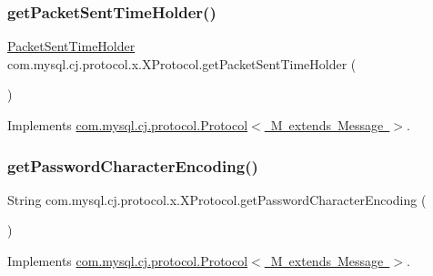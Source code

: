 \subsubsection{\texorpdfstring{get\+Packet\+Sent\+Time\+Holder()}{getPacketSentTimeHolder()}}
{\footnotesize\ttfamily \mbox{\hyperlink{interfacecom_1_1mysql_1_1cj_1_1protocol_1_1_packet_sent_time_holder}{Packet\+Sent\+Time\+Holder}} com.\+mysql.\+cj.\+protocol.\+x.\+X\+Protocol.\+get\+Packet\+Sent\+Time\+Holder (\begin{DoxyParamCaption}{ }\end{DoxyParamCaption})}



Implements \mbox{\hyperlink{interfacecom_1_1mysql_1_1cj_1_1protocol_1_1_protocol_a412e8ba9beb161548f142a1178c910d2}{com.\+mysql.\+cj.\+protocol.\+Protocol$<$ M extends Message $>$}}.

\mbox{\label{classcom_1_1mysql_1_1cj_1_1protocol_1_1x_1_1_x_protocol_afb296fd1ce274c0cb1fc920ce64220fe}} 
\subsubsection{\texorpdfstring{get\+Password\+Character\+Encoding()}{getPasswordCharacterEncoding()}}
{\footnotesize\ttfamily String com.\+mysql.\+cj.\+protocol.\+x.\+X\+Protocol.\+get\+Password\+Character\+Encoding (\begin{DoxyParamCaption}{ }\end{DoxyParamCaption})}



Implements \mbox{\hyperlink{interfacecom_1_1mysql_1_1cj_1_1protocol_1_1_protocol_a60c0f5b5a210c088b9bf761e828031b1}{com.\+mysql.\+cj.\+protocol.\+Protocol$<$ M extends Message $>$}}.

\mbox{\label{classcom_1_1mysql_1_1cj_1_1protocol_1_1x_1_1_x_protocol_aa6abdec32fdb1e18c44c33b831b40e20}} 

